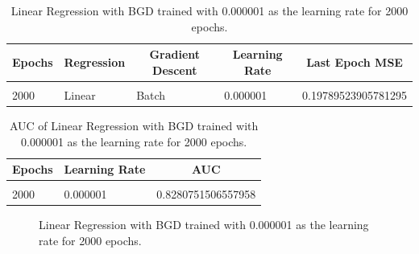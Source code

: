 \documentclass{article} %
\begin{document}
\begin{table}[!htbp]
\caption{Linear Regression with BGD trained with 0.000001 as the learning rate for 2000 epochs.}
\label{Table9}
\begin{center}
\begin{tabular}{l l l l l}
\multicolumn{1}{c}{\bf Epochs} &\multicolumn{1}{c}{\bf Regression}  &\multicolumn{1}{c}{\bf Gradient Descent} &\multicolumn{1}{c}{\bf Learning Rate} &\multicolumn{1}{c}{\bf Last Epoch MSE}
\\ \hline \\

2000 & Linear & Batch & 0.000001 & 0.19789523905781295\\

\end{tabular}
\end{center}
\end{table}

\begin{table}[!htbp]
\caption{AUC of Linear Regression with BGD trained with 0.000001 as the learning rate for 2000 epochs.}
\label{Table10}
\begin{center}
\begin{tabular}{l l l}
\multicolumn{1}{c}{\bf Epochs} &\multicolumn{1}{c}{\bf Learning Rate} &\multicolumn{1}{c}{\bf AUC}
\\ \hline \\

2000 & 0.000001 & 0.8280751506557958\\

\end{tabular}
\end{center}
\end{table}

\begin{figure}[!htbp]
\begin{center}
\end{center}
\caption{Linear Regression with BGD trained with 0.000001 as the learning rate for 2000 epochs.}
\label{Fig13}
\end{figure}
\end{document}
